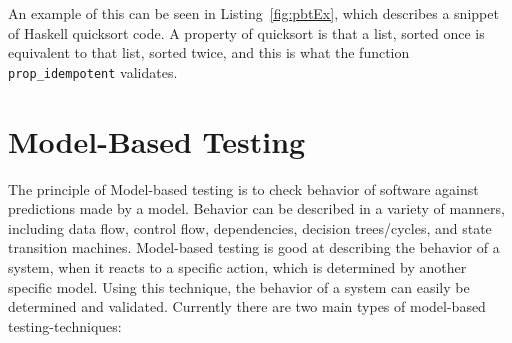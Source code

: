 An example of this can be seen in Listing~\ref{fig:pbtEx}, which describes a snippet of Haskell quicksort code. A property of quicksort is that a list, sorted once is equivalent to that list, sorted twice, and this is what the function \lstinline{prop_idempotent} validates.

\section{Model-Based Testing}

The principle of Model-based testing is to check behavior of software against predictions made by a model. Behavior can be described in a variety of manners, including data flow, control flow, dependencies, decision trees/cycles, and state transition machines. Model-based testing is good at describing the behavior of a system, when it reacts to a specific action, which is determined by another specific model. Using this technique, the behavior of a system can easily be determined and validated. Currently there are two main types of model-based testing-techniques:

